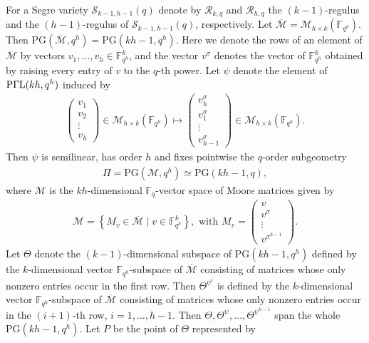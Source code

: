 \documentclass[11pt]{article}
\theoremstyle{definition}
\numberwithin{equation}{section}
\def\cM{\mathcal M}
\def\cR{\mathcal R}
\def\cS{\mathcal S}
\def\PG{\mathrm{PG}}
\def\F{{\mathbb F}}
\def\PGaL{{\rm P\Gamma L}}
\begin{document}
For a Segre variety $\cS_{k-1, h-1}(q)$ denote by $\cR_{k, q}$ and $\cR_{h, q}$ the $(k-1)$-regulus and the $(h-1)$-regulus of $\cS_{k-1, h-1}(q)$, respectively. Let $\overline{\cM}  = \cM_{h\times k}(\F_{q^h})$. Then $\PG(\overline{\cM} , q^h) = \PG(kh-1,q^h)$. Here we denote the rows of an element of $\overline{\cM} $ by vectors $v_1, \ldots, v_{h} \in \F_{q^h}^k$, and the vector $v^\sigma$ denotes the vector of $\F_{q^h}^k$ obtained by raising every entry of $v$ to the $q$-th power. Let $\psi$ denote the element of $\PGaL(kh, q^h)$ induced by
\begin{align*}
\begin{pmatrix}
v_1 \\
v_2 \\
\vdots \\
v_{h}
\end{pmatrix} \in \cM_{h \times k}(\F_{q^h})
\mapsto
\begin{pmatrix}
v_{h}^\sigma \\
v_1^\sigma \\
\vdots \\
v_{h-1}^\sigma
\end{pmatrix} \in \cM_{h \times k}(\F_{q^h}).
\end{align*}
Then $\psi$ is semilinear, has order $h$ and fixes pointwise the $q$-order subgeometry 
\begin{align*}
\Pi = \PG(\cM, q^h) \simeq \PG(kh-1, q), 
\end{align*}
where $\cM$ is the $kh$-dimensional $\F_q$-vector space of Moore matrices given by  
\begin{align*}
\cM = \left\{M_v \in \overline{\cM}  \mid v \in \F_{q^h}^k\right\}, \mbox{ with } 
M_v = 
\begin{pmatrix}
v \\
v^\sigma \\
\vdots \\
v^{\sigma^{h-1}} 
\end{pmatrix}.
\end{align*}
Let $\Theta$ denote the $(k-1)$-dimensional subspace of $\PG(kh-1, q^h)$ defined by the $k$-dimensional vector $\F_{q^h}$-subspace of $\overline{\cM} $ consisting of matrices whose only nonzero entries occur in the first row. Then $\Theta^{\psi^i}$ is defined by the $k$-dimensional vector $\F_{q^h}$-subspace of $\overline{\cM} $ consisting of matrices whose only nonzero entries occur in the $(i+1)$-th row, $i = 1, \dots, h-1$. Then $\Theta, \Theta^{\psi}, \ldots, \Theta^{\psi^{h-1}}$ span the whole $\PG(kh-1, q^h)$. Let $P$ be the point of $\Theta$ represented by 
\end{document}
